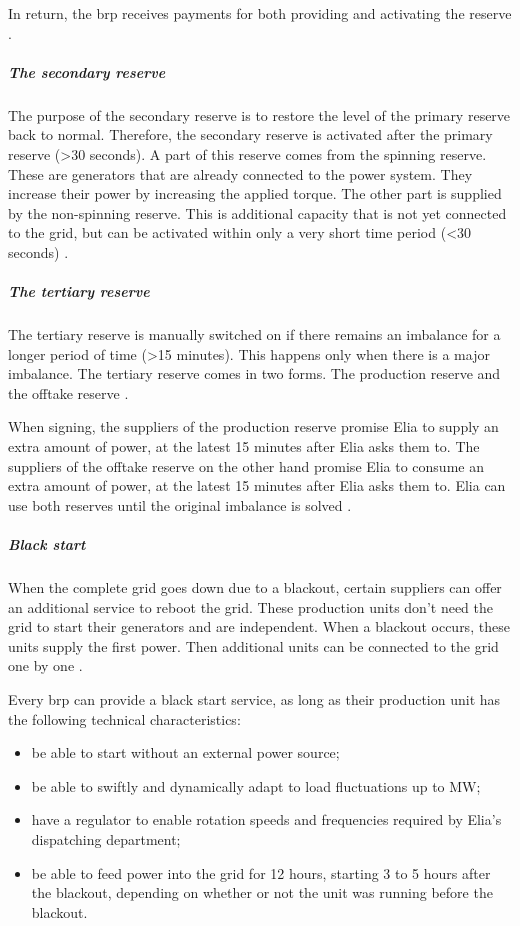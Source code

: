 In return, the \gls{brp} receives payments for both providing and activating the reserve \cite{EliaRP}.

\subparagraph{The secondary reserve}

The purpose of the secondary reserve is to restore the level of the primary reserve back to normal. Therefore, the secondary reserve is activated after the primary reserve (>30 seconds). A part of this reserve comes from the spinning reserve. These are generators that are already connected to the power system. They increase their power by increasing the applied torque. The other part is supplied by the non-spinning reserve. This is additional capacity that is not yet connected to the grid, but can be activated within only a very short time period (<30 seconds) \cite{EliaRS,Rebours2005}.

\subparagraph{The tertiary reserve}

The tertiary reserve is manually switched on if there remains an imbalance for a longer period of time (>15 minutes). This happens only when there is a major imbalance. The tertiary reserve comes in two forms. The production reserve and the offtake reserve \cite{EliaRT1,EliaRT2}.

When signing, the suppliers of the production reserve promise Elia to supply an extra amount of power, at the latest 15 minutes after Elia asks them to. The suppliers of the offtake reserve on the other hand promise Elia to consume an extra amount of power, at the latest 15 minutes after Elia asks them to. Elia can use both reserves until the original imbalance is solved \cite{EliaRT1,EliaRT2}.

\subparagraph{Black start}

When the complete grid goes down due to a blackout, certain suppliers can offer an additional service to reboot the grid. These production units don't need the grid to start their generators and are independent. When a blackout occurs, these units supply the first power. Then additional units can be connected to the grid one by one \cite{EliaBS}.

Every \gls{brp} can provide a black start service, as long as their production unit has the following technical characteristics:
\begin{itemize}
\item be able to start without an external power source;
\item be able to swiftly and dynamically adapt to load fluctuations up to \unit[10]{MW};
\item have a regulator to enable rotation speeds and frequencies required by Elia's dispatching department;
\item be able to feed power into the grid for 12 hours, starting 3 to 5 hours after the blackout, depending on whether or not the unit was running before the blackout.
\end{itemize}

